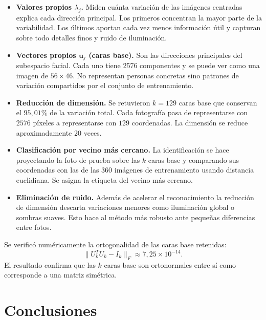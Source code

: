 \documentclass[12pt, letterpaper]{article}
\begin{document}
\begin{itemize}
    \item \textbf{Valores propios $\lambda_j$.} Miden cuánta
    variación de las imágenes centradas explica cada dirección
    principal. Los primeros concentran la mayor parte de la
    variabilidad. Los últimos aportan cada vez menos información
    útil y capturan sobre todo detalles finos y ruido de
    iluminación.

    \item \textbf{Vectores propios $\mathbf{u}_j$ (caras base).}
    Son las direcciones principales del subespacio facial. Cada
    uno tiene 2576 componentes y se puede ver como una imagen de
    $56 \times 46$. No representan personas concretas sino
    patrones de variación compartidos por el conjunto de
    entrenamiento.

    \item \textbf{Reducción de dimensión.} Se retuvieron
    $k = 129$ caras base que conservan el $95{,}01\%$ de la
    variación total. Cada fotografía pasa de representarse con
    $2576$ píxeles a representarse con $129$ coordenadas. La
    dimensión se reduce aproximadamente 20 veces.

    \item \textbf{Clasificación por vecino más cercano.} La
    identificación se hace proyectando la foto de prueba sobre
    las $k$ caras base y comparando sus coordenadas con las de
    las 360 imágenes de entrenamiento usando distancia euclidiana.
    Se asigna la etiqueta del vecino más cercano.

    \item \textbf{Eliminación de ruido.} Además de acelerar el
    reconocimiento la reducción de dimensión descarta variaciones
    menores como iluminación global o sombras suaves. Esto hace
    al método más robusto ante pequeñas diferencias entre fotos.
\end{itemize}

Se verificó numéricamente la ortogonalidad de las caras base
retenidas:
\[
    \|U_k^{T} U_k - I_k\|_F \approx 7{,}25 \times 10^{-14}.
\]
El resultado confirma que las $k$ caras base son ortonormales
entre sí como corresponde a una matriz simétrica.

\section{Conclusiones}
\end{document}
